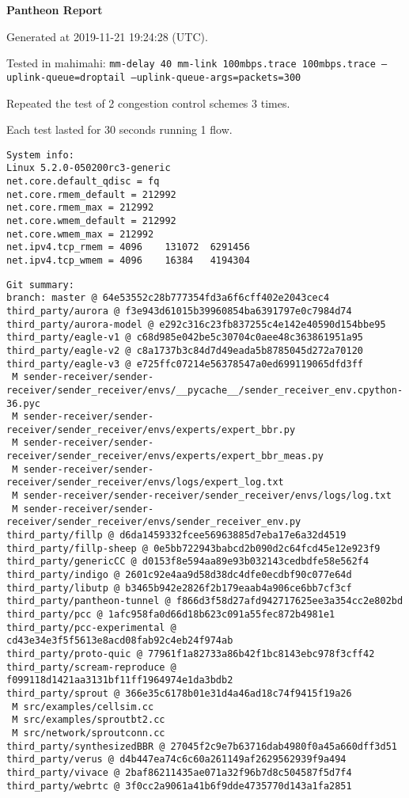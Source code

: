 \documentclass{article}
\begin{document}
\centerline{\textbf{\large{Pantheon Report}}}
\vspace{20pt}

Generated at 2019-11-21 19:24:28 (UTC).

Tested in mahimahi: \texttt{mm-delay 40 mm-link 100mbps.trace 100mbps.trace --uplink-queue=droptail --uplink-queue-args=packets=300}

Repeated the test of 2 congestion control schemes 3 times.

Each test lasted for 30 seconds running 1 flow.

\begin{verbatim}
System info:
Linux 5.2.0-050200rc3-generic
net.core.default_qdisc = fq
net.core.rmem_default = 212992
net.core.rmem_max = 212992
net.core.wmem_default = 212992
net.core.wmem_max = 212992
net.ipv4.tcp_rmem = 4096	131072	6291456
net.ipv4.tcp_wmem = 4096	16384	4194304
\end{verbatim}

\begin{verbatim}
Git summary:
branch: master @ 64e53552c28b777354fd3a6f6cff402e2043cec4
third_party/aurora @ f3e943d61015b39960854ba6391797e0c7984d74
third_party/aurora-model @ e292c316c23fb837255c4e142e40590d154bbe95
third_party/eagle-v1 @ c68d985e042be5c30704c0aee48c363861951a95
third_party/eagle-v2 @ c8a1737b3c84d7d49eada5b8785045d272a70120
third_party/eagle-v3 @ e725ffc07214e56378547a0ed699119065dfd3ff
 M sender-receiver/sender-receiver/sender_receiver/envs/__pycache__/sender_receiver_env.cpython-36.pyc
 M sender-receiver/sender-receiver/sender_receiver/envs/experts/expert_bbr.py
 M sender-receiver/sender-receiver/sender_receiver/envs/experts/expert_bbr_meas.py
 M sender-receiver/sender-receiver/sender_receiver/envs/logs/expert_log.txt
 M sender-receiver/sender-receiver/sender_receiver/envs/logs/log.txt
 M sender-receiver/sender-receiver/sender_receiver/envs/sender_receiver_env.py
third_party/fillp @ d6da1459332fcee56963885d7eba17e6a32d4519
third_party/fillp-sheep @ 0e5bb722943babcd2b090d2c64fcd45e12e923f9
third_party/genericCC @ d0153f8e594aa89e93b032143cedbdfe58e562f4
third_party/indigo @ 2601c92e4aa9d58d38dc4dfe0ecdbf90c077e64d
third_party/libutp @ b3465b942e2826f2b179eaab4a906ce6bb7cf3cf
third_party/pantheon-tunnel @ f866d3f58d27afd942717625ee3a354cc2e802bd
third_party/pcc @ 1afc958fa0d66d18b623c091a55fec872b4981e1
third_party/pcc-experimental @ cd43e34e3f5f5613e8acd08fab92c4eb24f974ab
third_party/proto-quic @ 77961f1a82733a86b42f1bc8143ebc978f3cff42
third_party/scream-reproduce @ f099118d1421aa3131bf11ff1964974e1da3bdb2
third_party/sprout @ 366e35c6178b01e31d4a46ad18c74f9415f19a26
 M src/examples/cellsim.cc
 M src/examples/sproutbt2.cc
 M src/network/sproutconn.cc
third_party/synthesizedBBR @ 27045f2c9e7b63716dab4980f0a45a660dff3d51
third_party/verus @ d4b447ea74c6c60a261149af2629562939f9a494
third_party/vivace @ 2baf86211435ae071a32f96b7d8c504587f5d7f4
third_party/webrtc @ 3f0cc2a9061a41b6f9dde4735770d143a1fa2851
\end{verbatim}
\end{document}
